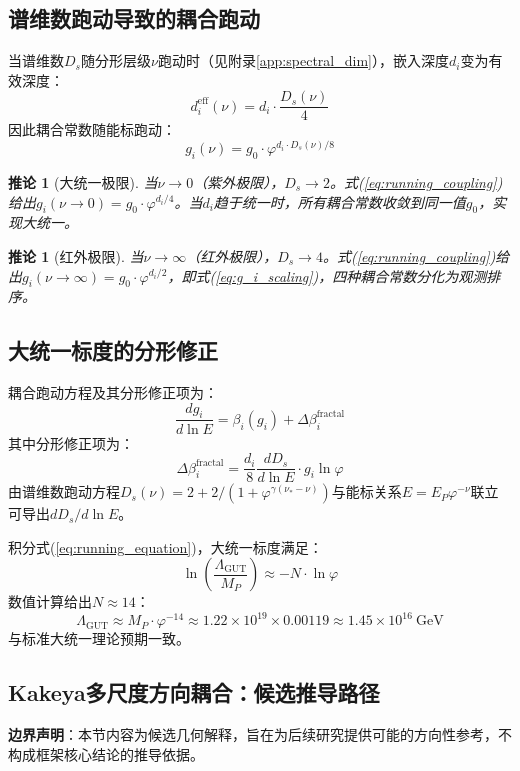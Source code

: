 \documentclass[12pt,a4paper,twocolumn]{article}
\renewcommand{\phi}{\varphi}
\newtheorem{corollary}[theorem]{推论}
\begin{document}
\subsection{谱维数跑动导致的耦合跑动}
当谱维数$D_s$随分形层级$\nu$跑动时（见附录\ref{app:spectral_dim}），嵌入深度$d_i$变为有效深度：
\begin{equation}
d_i^{\text{eff}}(\nu) = d_i \cdot \frac{D_s(\nu)}{4}
\label{eq:effective_depth}
\end{equation}
因此耦合常数随能标跑动：
\begin{equation}
g_i(\nu) = g_0 \cdot \phi^{d_i \cdot D_s(\nu)/8}
\label{eq:running_coupling}
\end{equation}

\begin{corollary}[大统一极限]
当$\nu \to 0$（紫外极限），$D_s \to 2$。式(\ref{eq:running_coupling})给出$g_i(\nu\to0) = g_0 \cdot \phi^{d_i/4}$。当$d_i$趋于统一时，所有耦合常数收敛到同一值$g_0$，实现大统一。
\end{corollary}

\begin{corollary}[红外极限]
当$\nu \to \infty$（红外极限），$D_s \to 4$。式(\ref{eq:running_coupling})给出$g_i(\nu\to\infty) = g_0 \cdot \phi^{d_i/2}$，即式(\ref{eq:g_i_scaling})，四种耦合常数分化为观测排序。
\end{corollary}

\subsection{大统一标度的分形修正}
耦合跑动方程及其分形修正项为：
\begin{equation}
\frac{dg_i}{d\ln E} = \beta_i(g_i) + \Delta\beta_i^{\text{fractal}}
\label{eq:running_equation}
\end{equation}
其中分形修正项为：
\[
\Delta\beta_i^{\text{fractal}} = \frac{d_i}{8}\frac{dD_s}{d\ln E} \cdot g_i \ln\phi
\]
由谱维数跑动方程$D_s(\nu) = 2 + 2/(1+\phi^{\gamma(\nu_*-\nu)})$与能标关系$E = E_P \phi^{-\nu}$联立可导出$dD_s/d\ln E$。

积分式(\ref{eq:running_equation})，大统一标度满足：
\[
\ln\left(\frac{\Lambda_{\text{GUT}}}{M_P}\right) \approx -N \cdot \ln\phi
\]
数值计算给出$N \approx 14$：
\[
\Lambda_{\text{GUT}} \approx M_P \cdot \phi^{-14} \approx 1.22\times10^{19} \times 0.00119 \approx 1.45\times10^{16}\ \text{GeV}
\]
与标准大统一理论预期一致。

\subsection{Kakeya多尺度方向耦合：候选推导路径}
\textbf{边界声明}：本节内容为候选几何解释，旨在为后续研究提供可能的方向性参考，不构成框架核心结论的推导依据。
\end{document}
